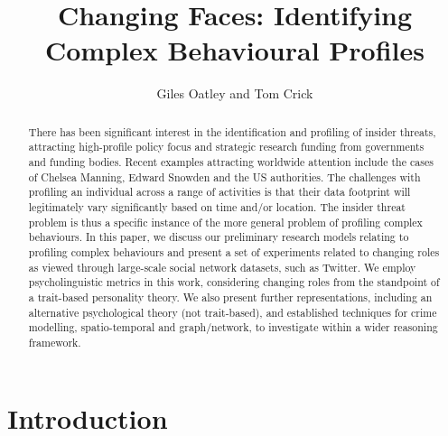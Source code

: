 \documentclass{llncs}
\title{Changing Faces: Identifying Complex Behavioural Profiles}
\author{Giles Oatley and Tom Crick}
\institute{Department of Computing \& Information Systems\\
Cardiff Metropolitan University\\
Cardiff CF5 2YB, UK\\
\email{\{goatley,tcrick\}@cardiffmet.ac.uk}
}
\begin{document}
%
\frontmatter          %
%
\pagestyle{headings}  %

\renewcommand{\thelstlisting}{\arabic{lstlisting}}

\maketitle

\begin{abstract}
There has been significant interest in the identification and
profiling of insider threats, attracting high-profile policy focus and
strategic research funding from governments and funding bodies.
Recent examples attracting worldwide attention include the cases of
Chelsea Manning, Edward Snowden and the US authorities. The challenges
with profiling an individual across a range of activities is that
their data footprint will legitimately vary significantly based on
time and/or location. The insider threat problem is thus a specific
instance of the more general problem of profiling complex
behaviours. In this paper, we discuss our preliminary research models
relating to profiling complex behaviours and present a set of
experiments related to changing roles as viewed through large-scale
social network datasets, such as Twitter. We employ psycholinguistic
metrics in this work, considering changing roles from the standpoint
of a trait-based personality theory.  We also present further
representations, including an alternative psychological theory (not
trait-based), and established techniques for crime modelling,
spatio-temporal and graph/network, to investigate within a wider
reasoning framework.
\end{abstract}

\section{Introduction}\label{intro}
\end{document}
